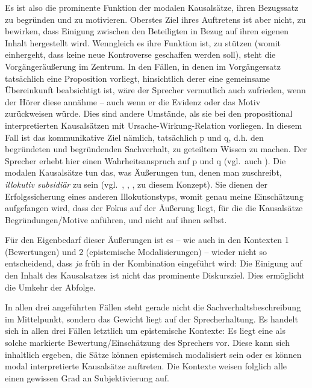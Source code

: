 Es ist also die prominente Funktion der modalen Kausalsätze, ihren Bezugssatz zu begründen und zu motivieren. Oberstes Ziel ihres Auftretens ist aber nicht, zu bewirken, dass Einigung zwischen den Beteiligten in Bezug auf ihren eigenen Inhalt hergestellt wird. Wenngleich es ihre Funktion ist, zu stützen (womit einhergeht, dass keine neue Kontroverse geschaffen werden soll), steht die Vorgänger\-äußerung im Zentrum. In den Fällen, in denen im Vorgängersatz tatsächlich eine Proposition vorliegt, hinsichtlich derer eine gemeinsame Übereinkunft beabsichtigt ist, wäre der Sprecher vermutlich auch zufrieden, wenn der Hörer diese annähme – auch wenn er die Evidenz oder das Motiv zurückweisen würde. Dies sind andere Umstände, als sie bei den propositional interpretierten Kausalsätzen mit Ursache-Wirkung-Relation vorliegen. In diesem Fall ist das kommunikative Ziel nämlich, tatsächlich p und q, d.h. den begründeten und begründenden Sachverhalt, zu geteiltem Wissen zu machen. Der Sprecher erhebt hier einen Wahrheitsanspruch auf p und q (vgl.\ auch \citealt[140]{Pasch1999}). Die modalen Kausalsätze tun das, was Äußerungen tun, denen man zuschreibt, \textit{illokutiv subsidiär} zu sein (vgl.\ \citealt[58]{Motsch1987}, \citealt[21]{Brandt1992a}, \citealt[54]{Pittner2007}, \citealt[178]{Pittner2011} zu diesem Konzept). Sie dienen der Erfolgssicherung eines anderen  Illokutionstyps, womit genau meine Einschätzung aufgefangen wird, dass der Fokus auf der Äußerung liegt, für die die Kausalsätze Begründungen/Motive anführen, und nicht auf ihnen selbst.
	
Für den Eigenbedarf dieser Äußerungen ist es – wie auch in den Kontexten 1 (Bewertungen) und 2 (epistemische Modalisierungen) – wieder nicht so entscheidend, dass \textit{ja} früh in der Kombination eingeführt wird: Die Einigung auf den Inhalt des Kausalsatzes ist nicht das prominente Diskursziel. Dies ermöglicht die Umkehr der Abfolge. 
	
In allen drei angeführten Fällen steht gerade nicht die Sachverhaltsbeschreibung im Mittelpunkt, sondern das Gewicht liegt auf der Sprecherhaltung. Es handelt sich in allen drei Fällen letztlich um epistemische Kontexte: Es liegt eine als solche markierte Bewertung/Einschätzung des Sprechers vor. Diese kann sich inhaltlich ergeben, die Sätze können epistemisch modalisiert sein oder es können modal interpretierte Kausalsätze auftreten. Die Kontexte weisen folglich alle einen gewissen Grad an Subjektivierung  auf.

